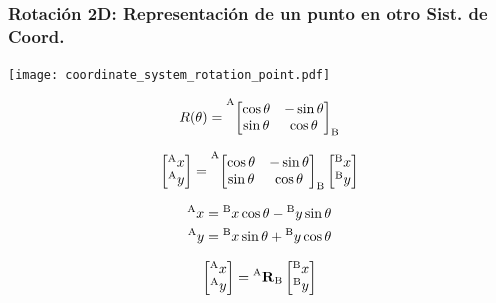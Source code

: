 \begin{frame}
    \frametitle{Rotación 2D: Representación de un punto en otro Sist. de Coord.}

    \begin{center}
        \begin{minipage}{0.4\linewidth}
            \texttt{[image: coordinate\_system\_rotation\_point.pdf]}
        \end{minipage}
        \hspace{1em}
        \begin{minipage}{0.5\linewidth}
            \begin{equation*}
                R(\theta) =
                \toCoord{\fromCoord{\begin{bmatrix}
                    \cos \theta & -\sin \theta \\
                    \sin \theta & \cos \theta
                \end{bmatrix}}{B}}{A}
            \end{equation*}

            \begin{equation*}
                \begin{bmatrix}
                    \toCoord{x}{A}\\
                    \toCoord{y}{A}
                \end{bmatrix} =
                \toCoord{\fromCoord{\begin{bmatrix}
                    \cos \theta &-\sin \theta \\
                    \sin \theta &\cos \theta
                \end{bmatrix}}{B}}{A}
                \begin{bmatrix}
                    \toCoord{x}{B}\\
                    \toCoord{y}{B}
                \end{bmatrix}
            \end{equation*}

            \begin{align*}
                \toCoord{x}{A} &= \toCoord{x}{B} \cos \theta -\toCoord{y}{B} \sin \theta\\
                \toCoord{y}{A} &= \toCoord{x}{B} \sin \theta + \toCoord{y}{B}\cos \theta
            \end{align*}

            \begin{equation*}
                \begin{bmatrix}
                    \toCoord{x}{A}\\
                    \toCoord{y}{A}
                \end{bmatrix} =
                \rotationCoord{A}{B}
                \begin{bmatrix}
                    \toCoord{x}{B}\\
                    \toCoord{y}{B}
                \end{bmatrix}
            \end{equation*}
        \end{minipage}
    \end{center}
\end{frame}


